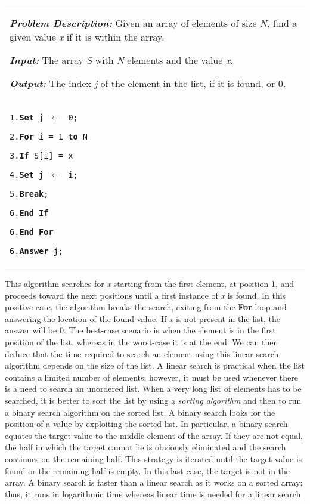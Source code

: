 {{{\begin{algorithm}[!h]
\noindent \begin{tabular}{@{}p{\textwidth}}
\textbf{\textit{Problem Description: }}Given an array of elements of size \textit{N, }find a given value \textit{x }if it is within the array.

\textbf{\textit{Input: }}The array \textit{S }with \textit{N }elements and the value \textit{x}.

\noindent \textbf{\textit{Output: }}The index \textit{j }of the element in the list, if it is found, or 0\textit{.}\\[-6pt] \hrulefill%

\medskip
\texttt{1.\qquad     \textbf{Set}  j \textbf{$\leftarrow$} 0;}

\texttt{2.\qquad     \textbf{For}  i = 1   \textbf{to}   N}

\texttt{3.\quad\qquad            \textbf{If }S[i] = x}

\texttt{4.\qquad\qquad                  \textbf{Set} j \textbf{$\leftarrow$} i;}

\texttt{5.\qquad\qquad                  \textbf{Break};}

\texttt{6.\qquad\quad            \textbf{End If}}

\texttt{6.\qquad     \textbf{End For}}

\texttt{6.\qquad     \textbf{Answer} j;}
\end{tabular}
\end{algorithm}

This algorithm searches for \textit{x} starting from the first element, at position 1, and proceeds toward the next positions until a first instance of \textit{x} is found. In this positive case, the algorithm breaks the search, exiting from the \textbf{For} loop and answering the location of the found value. If \textit{x} is not present in the list, the answer will be 0. The best-case scenario is when the element is in the first position of the list, whereas in the worst-case it is at the end. We can then deduce that the time required to search an element using this linear search algorithm depends on the size of the list. A linear search is practical when the list contains a limited number of elements; however, it must be used whenever there is a need to search an unordered list. When a very long list of elements has to be searched, it is better to sort the list by using a \textit{sorting algorithm} and then to run a binary search algorithm on the sorted list. A binary search looks for the position of a value by exploiting the sorted list. In particular, a binary search equates the target value to the middle element of the array. If they are not equal, the half in which the target cannot lie is obviously eliminated and the search continues on the remaining half. This strategy is iterated until the target value is found or the remaining half is empty. In this last case, the target is not in the array. A binary search is faster than a linear search as it works on a sorted array; thus, it runs in logarithmic time whereas linear time is needed for a linear search.

}}}
